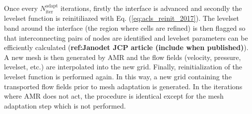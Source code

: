Once every $N_\mathrm{iter}^\mathrm{adapt}$ iterations, firstly the interface is advanced and secondly the levelset function is reinitiliazed with Eq. (\ref{eq:acls_reinit_2017}). The levelset band around the interface (the region where cells are refined) is then flagged so that interconnecting pairs of nodes are identified and levelset parameters can be efficiently calculated (\textbf{ref:Janodet JCP article (include when published)}). A new mesh is then generated by AMR and the flow fields (velocity, pressure, levelset, etc.) are interpolated into the new grid. Finally, reinitialization of the levelset function is performed again. In this way, a new grid containing the transported flow fields prior to mesh adaptation is generated. In the iterations where AMR does not act, the procedure is identical except for the mesh adaptation step which is not performed. %

